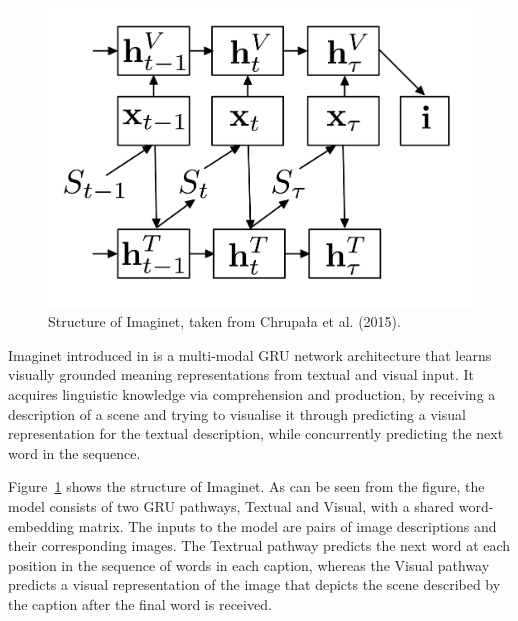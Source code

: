 \begin{figure}
\begin{center}
\includegraphics[scale=0.25]{imaginet.pdf} 
\caption{Structure of {\sc Imaginet}, taken from Chrupała et al. (2015).}
\label{fig:imaginet}
\end{center}
\end{figure}

{\sc Imaginet} introduced in  is a
multi-modal GRU network architecture that learns visually grounded
meaning representations from textual and visual input.  It acquires 
linguistic knowledge via comprehension and production, by receiving a
description of a scene and trying to visualise it through predicting a visual
representation for the textual description, while concurrently predicting 
the next word in the sequence. 

Figure~\ref{fig:imaginet} shows the structure of {\sc Imaginet}. As can
be seen from the figure, the model consists of two GRU pathways, 
{\sc Textual} and {\sc Visual}, with a shared word-embedding matrix. 
The inputs to the model are pairs of image descriptions and their 
corresponding images. The {\sc Textrual} pathway predicts the next 
word at each position in the sequence of words in each caption, whereas the 
{\sc Visual} pathway predicts a visual representation of the image that depicts the 
scene described by the caption after the final word is received.

